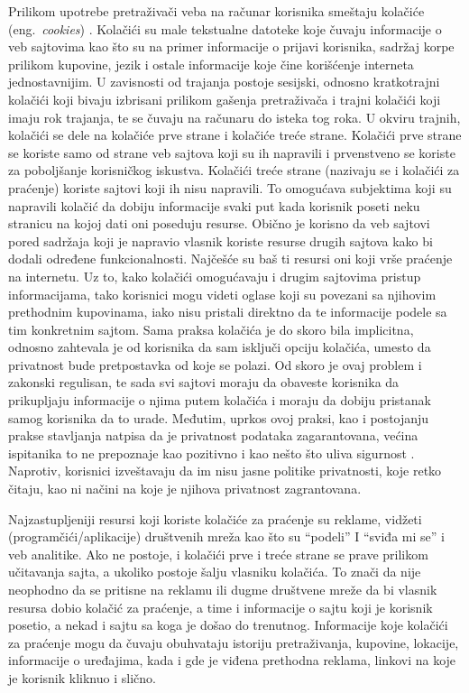 \documentclass[a4paper]{article}
\begin{document}
Prilikom upotrebe pretraživači veba na računar korisnika smeštaju kolačiće (eng.~{\em cookies}) \cite{cookies1}. Kolačići su male tekstualne datoteke koje čuvaju informacije o veb sajtovima kao što su na primer informacije o prijavi korisnika, sadržaj korpe prilikom  kupovine, jezik i ostale informacije koje čine korišćenje interneta jednostavnijim. U zavisnosti od trajanja postoje sesijski, odnosno kratkotrajni kolačići koji bivaju izbrisani prilikom gašenja pretraživača i trajni kolačići koji imaju rok trajanja, te se čuvaju na računaru do isteka tog roka. U okviru trajnih, kolačići se dele na kolačiće prve strane i kolačiće treće strane.  Kolačići prve strane se koriste samo od strane veb sajtova koji su ih napravili i prvenstveno se koriste za poboljšanje korisničkog iskustva. Kolačići treće strane (nazivaju se i kolačići za praćenje) koriste  sajtovi koji ih nisu napravili. To omogućava subjektima koji su napravili kolačić da dobiju informacije svaki put kada korisnik poseti neku stranicu na kojoj dati oni poseduju resurse. Obično je korisno da veb sajtovi pored sadržaja koji je napravio vlasnik koriste resurse drugih sajtova kako bi dodali određene  funkcionalnosti. Najčešće su baš ti resursi oni koji vrše praćenje na internetu. Uz to, kako kolačići omogućavaju i drugim sajtovima pristup informacijama, tako korisnici mogu videti oglase koji su povezani sa njihovim prethodnim kupovinama, iako nisu pristali direktno da te informacije podele sa tim konkretnim sajtom. Sama praksa kolačića je do skoro bila implicitna, odnosno zahtevala je od korisnika da sam isključi opciju kolačića, umesto da privatnost bude pretpostavka od koje se polazi. Od skoro je ovaj problem i zakonski regulisan, te sada svi sajtovi moraju da obaveste korisnika da prikupljaju informacije o njima putem kolačića i moraju da dobiju pristanak samog korisnika da to urade. Međutim, uprkos ovoj praksi, kao i postojanju prakse stavljanja natpisa da je privatnost podataka zagarantovana, većina ispitanika to ne prepoznaje kao pozitivno i kao nešto što uliva sigurnost \cite{cookies2}. Naprotiv, korisnici izveštavaju da im nisu jasne politike privatnosti, koje retko čitaju, kao ni načini na koje je njihova privatnost zagrantovana.
\par Najzastupljeniji resursi koji koriste kolačiće za praćenje su reklame, vidžeti (programčići/aplikacije) društvenih mreža kao što su “podeli” I “sviđa mi se” i veb analitike. Ako ne postoje, i kolačići prve i treće strane se prave prilikom učitavanja sajta, a ukoliko postoje šalju vlasniku kolačića. To znači da nije neophodno da se pritisne na reklamu ili dugme društvene mreže da bi vlasnik resursa dobio kolačić za praćenje, a time i informacije o sajtu koji je korisnik posetio, a nekad i sajtu sa koga je došao do trenutnog. Informacije koje kolačići za praćenje mogu da čuvaju obuhvataju istoriju pretraživanja, kupovine, lokacije, informacije o uređajima, kada i gde je viđena prethodna reklama, linkovi na koje je korisnik kliknuo i slično. 
\end{document}
